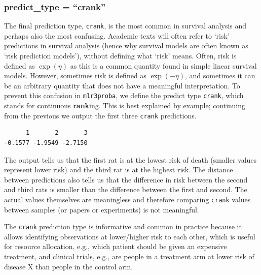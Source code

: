 \hypertarget{predict_type-crank}{%
\subsubsection*{predict\_type = ``crank''}\label{predict_type-crank}}

The final prediction type, \texttt{crank}, is the most common in
survival analysis and perhaps also the most confusing. Academic texts
will often refer to `risk' predictions in survival analysis (hence why
survival models are often known as `risk prediction models'), without
defining what `risk' means. Often, risk is defined as \(\exp(\eta)\) as
this is a common quantity found in simple linear survival models.
However, sometimes risk is defined as \(\exp(-\eta)\), and sometimes it
can be an arbitrary quantity that does not have a meaningful
interpretation. To prevent this confusion in \texttt{mlr3proba}, we
define the predict type \texttt{crank}, which stands for
\textbf{c}ontinuous \textbf{rank}ing. This is best explained by example;
continuing from the previous we output the first three \texttt{crank}
predictions.

\begin{Shaded}
\begin{Highlighting}[]
\SpecialCharTok{$}\NormalTok{crank[}\SpecialCharTok{:}\NormalTok{]}
\end{Highlighting}
\end{Shaded}

\begin{verbatim}
      1       2       3 
-0.1577 -1.9549 -2.7150 
\end{verbatim}

The output tells us that the first rat is at the lowest risk of death
(smaller values represent lower risk) and the third rat is at the
highest risk. The distance between predictions also tells us that the
difference in risk between the second and third rats is smaller than the
difference between the first and second. The actual values themselves
are meaningless and therefore comparing \texttt{crank} values between
samples (or papers or experiments) is not meaningful.

The \texttt{crank} prediction type is informative and common in practice
because it allows identifying observations at lower/higher risk to each
other, which is useful for resource allocation, e.g., which patient
should be given an expensive treatment, and clinical trials, e.g., are
people in a treatment arm at lower risk of disease X than people in the
control arm.

